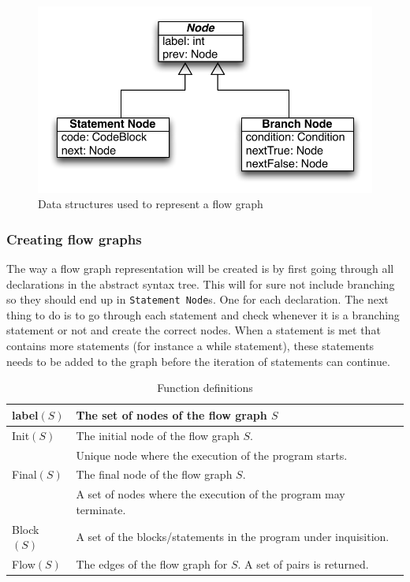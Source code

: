 \begin{figure}[h]
	\centering
	\includegraphics[scale=1.0]{../img/flow_graph}
	\caption{Data structures used to represent a flow graph}
	\label{fig:flowgraph}
\end{figure}

\subsubsection{Creating flow graphs}
The way a flow graph representation will be created is by first going through all declarations in the abstract syntax tree. This will for sure not include branching so they should end up in \texttt{Statement Node}s. One for each declaration. The next thing to do is to go through each statement and check whenever it is a branching statement or not and create the correct nodes. When a statement is met that contains more statements (for instance a while statement), these statements needs to be added to the graph before the iteration of statements can continue.

\begin{table}
    \begin{tabular}{l | l }
    label$(S)$ & The set of nodes of the flow graph $S$ \\
    \hline    
    Init$(S)$  & The initial node of the flow graph $S$.\\
               & Unique node where the execution of the program starts.\\
    \hline
    Final$(S)$   & The final node of the flow graph $S$.\\
                 & A set of nodes where the execution of the program may terminate.\\
    \hline
    Block$(S)$   & A set of the blocks/statements in the program under inquisition.\\
    \hline
    Flow$(S)$& The edges of the flow graph for $S$. A set of pairs is returned. \\
    \end{tabular}
    \centering
	\caption{Function definitions}
	\label{table:flow_graph_definitions}
\end{table}


